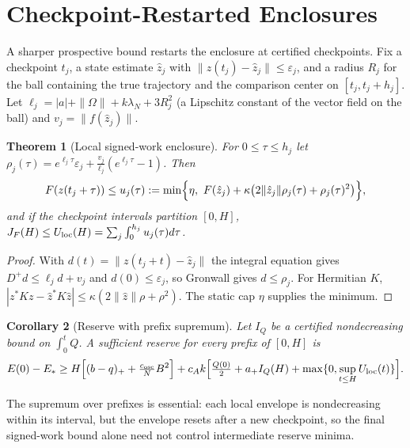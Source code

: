 \documentclass[11pt,notitlepage]{report}
\newtheorem{theorem}{Theorem}[chapter]
\newtheorem{corollary}[theorem]{Corollary}
\theoremstyle{definition}
\theoremstyle{remark}
\begin{document}
\section{Checkpoint-Restarted Enclosures}
A sharper prospective bound restarts the enclosure at certified checkpoints. Fix a checkpoint $t_j$, a state estimate $\hat z_j$ with $\|z(t_j)-\hat z_j\|\le\varepsilon_j$, and a radius $R_j$ for the ball containing the true trajectory and the comparison center on $[t_j,t_j+h_j]$. Let $\ell_j=|a|+\|\Omega\|+k\lambda_N+3R_j^2$ (a Lipschitz constant of the vector field on the ball) and $v_j=\|f(\hat z_j)\|$.
\begin{theorem}[Local signed-work enclosure]\label{th:local}
For $0\le\tau\le h_j$ let $\rho_j(\tau)=e^{\ell_j\tau}\varepsilon_j+\tfrac{v_j}{\ell_j}(e^{\ell_j\tau}-1)$. Then
\[
F(z(t_j+\tau))\le u_j(\tau):=\min\Bigl\{\eta,\ F(\hat z_j)+\kappa\bigl(2\|\hat z_j\|\rho_j(\tau)+\rho_j(\tau)^2\bigr)\Bigr\},
\]
and if the checkpoint intervals partition $[0,H]$, $J_F(H)\le U_{\rm loc}(H)=\sum_j\int_0^{h_j}u_j(\tau)d\tau$.
\end{theorem}
\begin{proof}
With $d(t)=\|z(t_j+t)-\hat z_j\|$ the integral equation gives $D^+d\le\ell_jd+v_j$ and $d(0)\le\varepsilon_j$, so Gronwall gives $d\le\rho_j$. For Hermitian $K$, $|z^*Kz-\hat z^*K\hat z|\le\kappa(2\|\hat z\|\rho+\rho^2)$. The static cap $\eta$ supplies the minimum.
\end{proof}
\begin{corollary}[Reserve with prefix supremum]\label{cor:prefix}
Let $I_Q$ be a certified nondecreasing bound on $\int_0^tQ$. A sufficient reserve for every prefix of $[0,H]$ is
\[
E(0)-E_*\ge H\Bigl[(b-q)_++\tfrac{c_{\rm osc}}NB^2\Bigr]+c_Ak\Bigl[\tfrac{Q(0)}2+a_+I_Q(H)+\max\{0,\sup_{t\le H}U_{\rm loc}(t)\}\Bigr].
\]
\end{corollary}
The supremum over prefixes is essential: each local envelope is nondecreasing within its interval, but the envelope resets after a new checkpoint, so the final signed-work bound alone need not control intermediate reserve minima.
\end{document}
